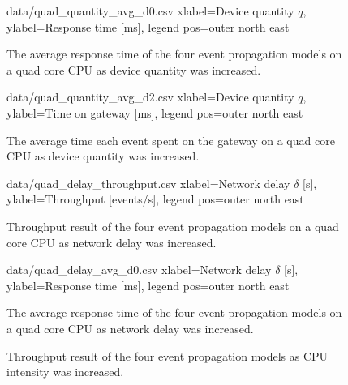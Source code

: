 \begin{figure}[h!]
    \centering
    \performanceplot
    {data/quad_quantity_avg_d0.csv}
    {
        xlabel=Device quantity $q$,
        ylabel={Response time [ms]},
        legend pos=outer north east
    }
    \caption{The average response time of the four event propagation models on
    a quad core CPU as device quantity was increased.}
    \label{fig:quad_quantity_avg_d0}
\end{figure}

\begin{figure}[h!]
    \centering
    \performanceplot
    {data/quad_quantity_avg_d2.csv}
    {
        xlabel=Device quantity $q$,
        ylabel={Time on gateway [ms]},
        legend pos=outer north east
    }
    \caption{The average time each event spent on the gateway on a quad core
    CPU as device quantity was increased.}
    \label{fig:quad_quantity_avg_d2}
\end{figure}

\begin{figure}[h!]
    \centering
    \performanceplot
    {data/quad_delay_throughput.csv}
    {
        xlabel={Network delay $\delta$ [s]},
        ylabel={Throughput [events/s]},
        legend pos=outer north east
    }
    \caption{Throughput result of the four event propagation models on a quad
    core CPU as network delay was increased.}
    \label{fig:quad_delay_throughput}
\end{figure}

\begin{figure}[h!]
    \centering
    \performanceplot
    {data/quad_delay_avg_d0.csv}
    {
        xlabel={Network delay $\delta$ [s]},
        ylabel={Response time [ms]},
        legend pos=outer north east
    }
    \caption{The average response time of the four event propagation models on
    a quad core CPU as network delay was increased.}
    \label{fig:quad_delay_avg_d0}
\end{figure}

\begin{figure}[h!]
    \centering
    \caption{Throughput result of the four event propagation models as CPU
    intensity was increased.}
    \label{fig:cpu_throughput}
\end{figure}

